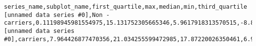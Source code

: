 \begin{verbatim}
series_name,subplot_name,first_quartile,max,median,min,third_quartile
[unnamed data series #0],Non - carriers,0.11198945981554975,15.131752305665346,5.9617918313570515,-8.847167325428195,9.914361001317525
[unnamed data series #0],carriers,7.964426877470356,21.034255599472985,17.87220026350461,6.963109354413704,18.873517786561266
\end{verbatim}
